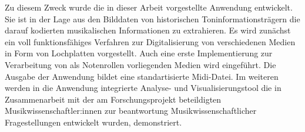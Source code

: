 Zu diesem Zweck wurde die in dieser Arbeit vorgestellte Anwendung entwickelt.
Sie ist in der Lage aus den Bilddaten von historischen Toninformationsträgern die darauf kodierten musikalischen Informationen zu extrahieren.
Es wird zunächst ein voll funktionsfähiges Verfahren zur Digitalisierung von verschiedenen Medien in Form von Lochplatten vorgestellt.
Auch eine erste Implementierung zur Verarbeitung von als Notenrollen vorliegenden Medien wird eingeführt.
Die Ausgabe der Anwendung bildet eine standartisierte Midi-Datei.
Im weiteren werden in die Anwendung integrierte Analyse- und Visualisierungstool die in Zusammenarbeit mit der am Forschungsprojekt beteildigten Musikwissenschaftler:innen zur beantwortung Musikwissenschaftlicher Fragestellungen entwickelt wurden, demonstriert.

